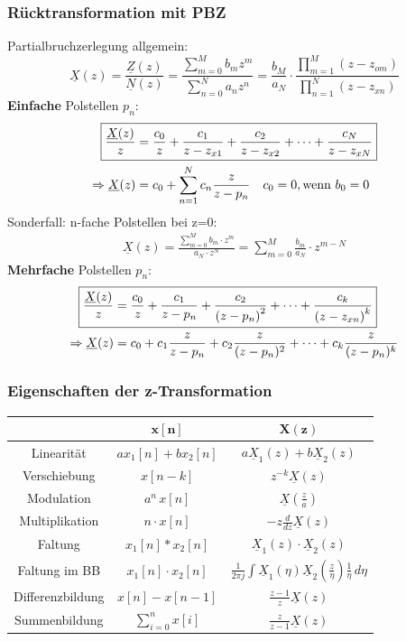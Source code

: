 \subsubsection{Rücktransformation mit PBZ}
Partialbruchzerlegung allgemein:
\[
\underline{X}(z)=\frac{\underline{Z}(z)}{\underline{N}(z)}=\frac{\sum_{m=0}^{M} b_{m} z^{m}}{\sum_{n=0}^{N} a_{n} z^{n}}=\frac{b_{M}}{a_{N}} \cdot \frac{\prod_{m=1}^{M}\left(z-z_{o m}\right)}{\prod_{n=1}^{N}\left(z-z_{x n}\right)}
\]
\textbf{Einfache} Polstellen $p_n$:
\begin{align*}
	\Aboxed{\frac{\underline{X}(z)}{z} & =\frac{c_{0}}{z}+\frac{c_{1}}{z-z_{x 1}}+\frac{c_{2}}{z-z_{x 2}}+\cdots+\frac{c_{N}}{z-z_{x N}}} \\
	\Rightarrow \underline{X}(z) &= c_0 + \sum_{n=1}^{N} c_n \frac{z}{z-p_n} \quad c_0=0, \text{wenn } b_0=0
\end{align*}
Sonderfall: n-fache Polstellen bei z=0:
\begin{align*}
	\underline{X}(z) = \frac{\sum_{m=0}^{M} b_m \cdot  z^m}{a_N \cdot z^N} = \sum_{m=0}^{M} \frac{b_m}{a_N} \cdot z^{m-N}
\end{align*}
\textbf{Mehrfache} Polstellen $p_n$:
\begin{align*}
	\Aboxed{\frac{\underline{X}(z)}{z} &=\frac{c_{0}}{z}+\frac{c_{1}}{z-p_n}+\frac{c_{2}}{\left(z-p_n\right)^{2}}+\cdots+\frac{c_{k}}{\left(z-z_{x n}\right)^{k}}}\\
			\Rightarrow \underline{X}(z) & = c_0 + c_1 \frac{z}{z-p_n}+c_2\frac{z}{(z-p_n)^2}+\cdots+c_k\frac{z}{(z-p_n)^k}
\end{align*}

\subsubsection{Eigenschaften der z-Transformation}
\renewcommand{\arraystretch}{1.7}
{\small 
\begin{tabularx}{\columnwidth}{|c|c|c|}
	\hline
	& $\mathbf{x[n]}$ & \underline{$\mathbf{X}$}$\mathbf{(z)}$\\
	\hline Linearität & $a x_{1}[n]+b x_{2}[n]$ & $a \underline{X}_{1}(z)+b\underline{X}_{2}(z)$ \\
	\hline Verschiebung	& $x[n-k]$ & $z^{-k} \underline{X}(z)$ \\
	\hline Modulation & $a^{n} \, x[n]$ & $\underline{X}\left(\frac{z}{a}\right)$ \\
	\hline Multiplikation & $n \cdot x[n] $ & $-z \frac{d}{d z} \underline{X}(z)$ \\
	\hline Faltung & $x_{1}[n] * x_{2}[n] $ & $ \underline{X}_{1}(z) \cdot \underline{X}_{2}(z)$ \\
	\hline Faltung im BB & $x_{1}[n] \cdot x_{2}[n] $ & $ \frac{1}{2\pi j} \int \underline{X}_1(\eta)\underline{X}_2(\frac{z}{\eta})\frac{1}{\eta}\, d\eta$ \\
	\hline Differenzbildung & $x[n]-x[n-1] $ & $ \frac{z-1}{z} \underline{X}(z)$ \\
	\hline Summenbildung & $\sum_{i=0}^{n} x[i] $ & $ \frac{z}{z-1} \underline{X}(z)$ \\
	\hline
\end{tabularx} }

